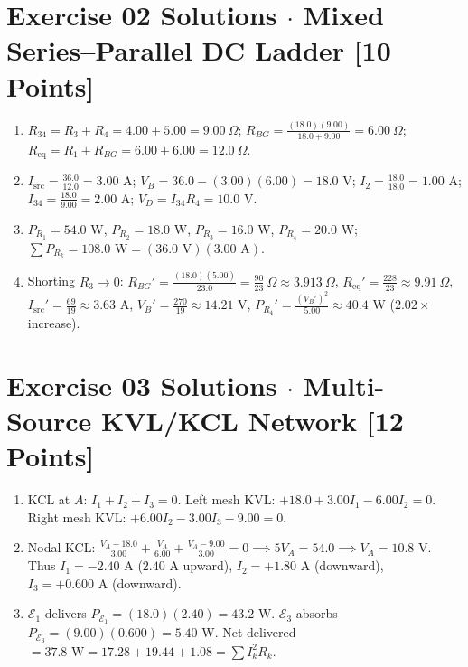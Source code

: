 \documentclass[10pt,letterpaper]{article}
\begin{document}
\section*{Exercise 02 Solutions $\cdot$ Mixed Series--Parallel DC Ladder \hfill [10 Points]}
\begin{enumerate}
  \item[(a)] $R_{34} = R_3 + R_4 = 4.00 + 5.00 = 9.00\ \Omega$; \quad $R_{BG} = \frac{(18.0)(9.00)}{18.0+9.00} = 6.00\ \Omega$; \quad $R_{\text{eq}} = R_1 + R_{BG} = 6.00 + 6.00 = 12.0\ \Omega$.
  \item[(b)] $I_{\text{src}} = \frac{36.0}{12.0} = 3.00\text{ A}$; \quad $V_B = 36.0 - (3.00)(6.00) = 18.0\text{ V}$; \quad $I_2 = \frac{18.0}{18.0} = 1.00\text{ A}$; \quad $I_{34} = \frac{18.0}{9.00} = 2.00\text{ A}$; \quad $V_D = I_{34}R_4 = 10.0\text{ V}$.
  \item[(c)] $P_{R_1}=54.0\text{ W}$, $P_{R_2}=18.0\text{ W}$, $P_{R_3}=16.0\text{ W}$, $P_{R_4}=20.0\text{ W}$; \quad $\sum P_{R_k} = 108.0\text{ W} = (36.0\text{ V})(3.00\text{ A})$.
  \item[(d)] Shorting $R_3 \to 0$: $R_{BG}' = \frac{(18.0)(5.00)}{23.0} = \frac{90}{23}\ \Omega \approx 3.913\ \Omega$, \quad $R_{\text{eq}}' = \frac{228}{23} \approx 9.91\ \Omega$, \quad $I_{\text{src}}' = \frac{69}{19} \approx 3.63\text{ A}$, \quad $V_B' = \frac{270}{19} \approx 14.21\text{ V}$, \quad $P_{R_4}' = \frac{(V_B')^2}{5.00} \approx 40.4\text{ W}$ ($2.02\times$ increase).
\end{enumerate}

\section*{Exercise 03 Solutions $\cdot$ Multi-Source KVL/KCL Network \hfill [12 Points]}
\begin{enumerate}
  \item[(a)] KCL at $A$: $I_1 + I_2 + I_3 = 0$. Left mesh KVL: $+18.0 + 3.00 I_1 - 6.00 I_2 = 0$. Right mesh KVL: $+6.00 I_2 - 3.00 I_3 - 9.00 = 0$.
  \item[(b)] Nodal KCL: $\frac{V_A - 18.0}{3.00} + \frac{V_A}{6.00} + \frac{V_A - 9.00}{3.00} = 0 \implies 5V_A = 54.0 \implies V_A = 10.8\text{ V}$. Thus $I_1 = -2.40\text{ A}$ ($2.40\text{ A}$ upward), $I_2 = +1.80\text{ A}$ (downward), $I_3 = +0.600\text{ A}$ (downward).
  \item[(c)] $\mathcal{E}_1$ delivers $P_{\mathcal{E}_1} = (18.0)(2.40) = 43.2\text{ W}$. $\mathcal{E}_3$ absorbs $P_{\mathcal{E}_3} = (9.00)(0.600) = 5.40\text{ W}$. Net delivered $= 37.8\text{ W} = 17.28 + 19.44 + 1.08 = \sum I_k^2 R_k$.
\end{enumerate}
\end{document}
